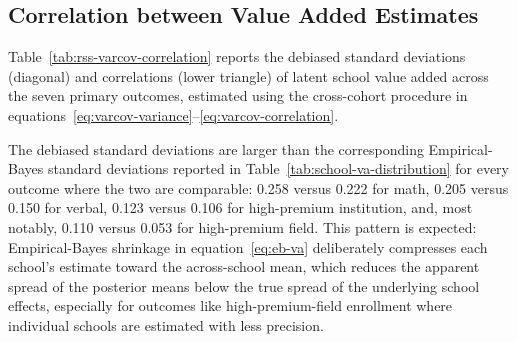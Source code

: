 \documentclass[a4paper, article, english, oneside, unknownkeysallowed, 12pt]{memoir}
\begin{document}






\subsection{Correlation between Value Added Estimates}

Table~\ref{tab:rss-varcov-correlation} reports the debiased standard deviations (diagonal) and correlations (lower triangle) of latent school value added across the seven primary outcomes, estimated using the cross-cohort procedure in equations~\eqref{eq:varcov-variance}--\eqref{eq:varcov-correlation}.



The debiased standard deviations are larger than the corresponding Empirical-Bayes standard deviations reported in Table~\ref{tab:school-va-distribution} for every outcome where the two are comparable: 0.258 versus 0.222 for math, 0.205 versus 0.150 for verbal, 0.123 versus 0.106 for high-premium institution, and, most notably, 0.110 versus 0.053 for high-premium field.
This pattern is expected: Empirical-Bayes shrinkage in equation~\eqref{eq:eb-va} deliberately compresses each school's estimate toward the across-school mean, which reduces the apparent spread of the posterior means below the true spread of the underlying school effects, especially for outcomes like high-premium-field enrollment where individual schools are estimated with less precision.
\end{document}
